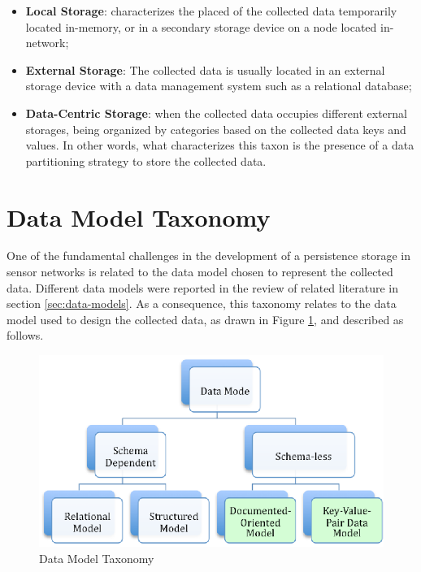 \begin{itemize}
  \item \textbf{Local Storage}: characterizes the placed of the collected data
  temporarily located in-memory, or in a secondary storage device on a node
  located in-network;
  \item \textbf{External Storage}: The collected data is usually located in an
  external storage device with a data management system such as a relational
  database;
  \item \textbf{Data-Centric Storage}: when the collected data occupies
  different external storages, being organized by categories based on the
  collected data keys and values. In other words, what characterizes this taxon
  is the presence of a data partitioning strategy to store the collected data.
\end{itemize}

\section{Data Model Taxonomy}

One of the fundamental challenges in the development of a persistence storage
in sensor networks is related to the data model chosen to represent the
collected data. Different data models were reported in the review of related
literature in section \ref{sec:data-models}. As a consequence, this taxonomy
relates to the data model used to design the collected data, as drawn in Figure
\ref{fig:taxonomy-data-model}, and described as follows.

\begin{figure}[h]
  \centering
  \includegraphics{../diagrams/taxonomy-data-model}
  \caption{Data Model Taxonomy}
  \label{fig:taxonomy-data-model}
\end{figure}

